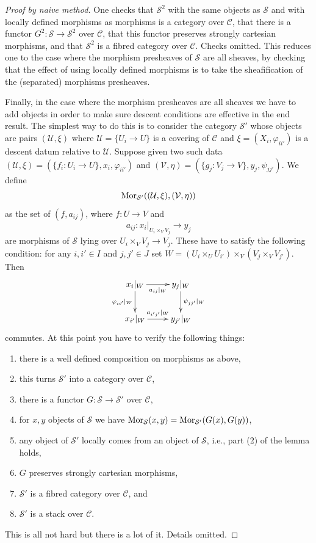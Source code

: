 \begin{proof}[Proof by naive method]
\medskip\noindent
One checks that $\mathcal{S}^2$ with the same objects as
$\mathcal{S}$ and with locally defined morphisms as morphisms
is a category over $\mathcal{C}$, that there is a functor
$G^2 : \mathcal{S} \to \mathcal{S}^2$ over $\mathcal{C}$,
that this functor preserves strongly cartesian morphisms,
and that $\mathcal{S}^2$ is a fibred category over $\mathcal{C}$.
Checks omitted. This reduces one to the case where the
morphism presheaves of $\mathcal{S}$ are all sheaves, by
checking that the effect of using locally defined morphisms
is to take the sheafification of the (separated) morphisms
presheaves.

\medskip\noindent
Finally, in the case where the morphism presheaves are all sheaves
we have to add objects in order to make sure descent conditions are
effective in the end result. The simplest way to do this is to
consider the category $\mathcal{S}'$ whose objects are
pairs $(\mathcal{U}, \xi)$ where
$\mathcal{U} = \{U_i \to U\}$ is a covering of $\mathcal{C}$ and
$\xi = (X_i, \varphi_{ii'})$ is a descent datum relative to $\mathcal{U}$.
Suppose given two such data
$(\mathcal{U}, \xi) = (\{f_i : U_i \to U\},  x_i, \varphi_{ii'})$ and
$(\mathcal{V}, \eta) = (\{g_j : V_j \to V\},  y_j, \psi_{jj'})$.
We define
$$
\mathop{\mathrm{Mor}}\nolimits_{\mathcal{S}'}((\mathcal{U}, \xi), (\mathcal{V}, \eta))
$$
as the set of $(f, a_{ij})$, where $f : U \to V$ and
$$
a_{ij} :
x_i|_{U_i \times_V V_j}
\longrightarrow
y_j
$$
are morphisms of $\mathcal{S}$ lying over $U_i \times_V V_j \to V_j$.
These have to satisfy the following condition: for any
$i, i' \in I$ and $j, j' \in J$ set
$W = (U_i \times_U U_{i'}) \times_V (V_j \times_V V_{j'})$. Then
$$
\xymatrix{
x_i|_W \ar[r]_{a_{ij}|_W} \ar[d]_{\varphi_{ii'}|_W} &
y_j|_W \ar[d]^{\psi_{jj'}|_W} \\
x_{i'}|_W \ar[r]^{a_{i'j'}|_W} &
y_{j'}|_W
}
$$
commutes. At this point you have to verify the following things:
\begin{enumerate}
\item there is a well defined composition on morphisms as above,
\item this turns $\mathcal{S}'$ into a category over $\mathcal{C}$,
\item there is a functor $G : \mathcal{S} \to \mathcal{S}'$ over $\mathcal{C}$,
\item for $x, y$ objects of $\mathcal{S}$ we have
$\mathop{\mathrm{Mor}}\nolimits_\mathcal{S}(x, y) = \mathop{\mathrm{Mor}}\nolimits_{\mathcal{S}'}(G(x), G(y))$,
\item any object of $\mathcal{S}'$ locally comes from an object of
$\mathcal{S}$, i.e., part (2) of the lemma holds,
\item $G$ preserves strongly cartesian morphisms,
\item $\mathcal{S}'$ is a fibred category over $\mathcal{C}$, and
\item $\mathcal{S}'$ is a stack over $\mathcal{C}$.
\end{enumerate}
This is all not hard but there is a lot of it. Details omitted.
\end{proof}

